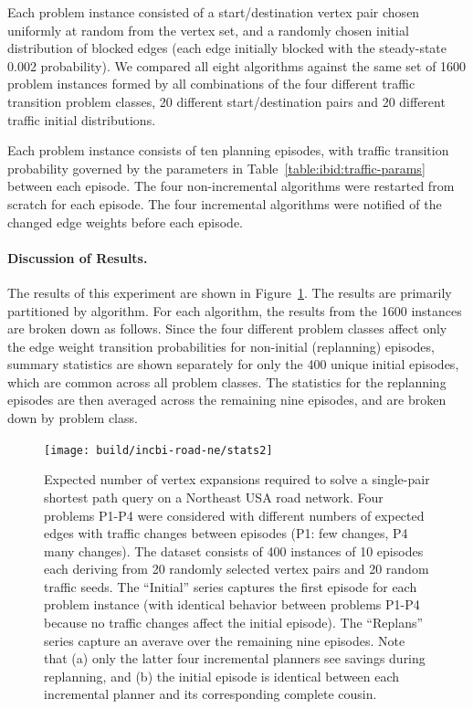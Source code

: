 Each problem instance consisted of a start/destination vertex
pair chosen uniformly at random from the vertex set,
and a randomly chosen initial distribution of blocked edges
(each edge initially blocked with the steady-state 0.002 probability).
We compared all eight algorithms against the same set of 1600
problem instances
formed by all combinations of
the four different traffic transition problem classes,
20 different start/destination pairs
and 20 different traffic initial distributions.

Each problem instance consists of ten planning episodes,
with traffic transition probability governed by the parameters
in Table~\ref{table:ibid:traffic-params} between each episode.
The four non-incremental algorithms were restarted from scratch
for each episode.
The four incremental algorithms were notified of the changed
edge weights before each episode.

\paragraph{Discussion of Results.}
The results of this experiment are shown
in Figure~\ref{fig:ibid:road-ne-stats}.
The results are primarily partitioned by algorithm.
For each algorithm,
the results from the 1600 instances are broken down as follows.
Since the four different problem classes affect only the edge weight
transition probabilities for non-initial (replanning) episodes,
summary statistics are shown separately for only the 400 unique
initial episodes,
which are common across all problem classes.
The statistics for the replanning episodes are then
averaged across the remaining nine episodes,
and are broken down by problem class.

\begin{figure}
   \centering
   \texttt{[image: build/incbi-road-ne/stats2]}
   \caption{Expected number of vertex expansions required to solve
      a single-pair shortest path query on a Northeast USA road network.
      Four problems P1-P4 were considered with different numbers of
      expected edges with traffic changes between episodes
      (P1: few changes, P4 many changes).
      The dataset consists of 400 instances of 10 episodes each
      deriving from 20 randomly selected vertex pairs
      and 20 random traffic seeds.
      The ``Initial'' series captures the first episode for each
      problem instance
      (with identical behavior between problems P1-P4 because
      no traffic changes affect the initial episode).
      The ``Replans'' series capture an averave over the remaining
      nine episodes.
      Note that
      (a) only the latter four incremental planners see savings during
      replanning,
      and (b) the initial episode is identical between each
      incremental planner and its corresponding complete cousin.}
   \label{fig:ibid:road-ne-stats}
\end{figure}

